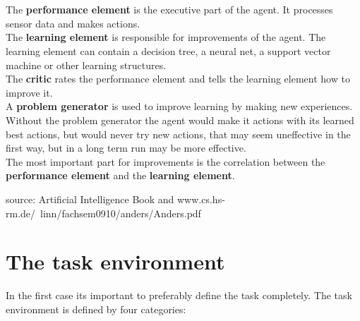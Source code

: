 \documentclass[10pt,a4paper,DIV=11]{scrreprt}
\begin{document}
   \\
\\

The \textbf{performance element} is the executive part of the agent. It processes sensor data and makes actions. \\

The \textbf{learning element} is responsible for improvements of the agent. The learning element can contain a decision tree, a neural net, a support vector machine or other learning structures. \\

The \textbf{critic} rates the performance element and tells the learning element how to improve it. \\

A \textbf{problem generator} is used to improve learning by making new experiences. Without the problem generator the agent would make it actions with its learned best actions, but would never try new actions, that may seem uneffective in the first way, but in a long term run may be more effective. \\

The most important part for improvements is the correlation between the \textbf{performance element} and the \textbf{learning element}.





source: Artificial Intelligence Book and www.cs.hs-rm.de/~linn/fachsem0910/anders/Anders.pdf


\section{The task environment}
\label{sec:env}
In the first case its important to preferably define the task completely. The task environment is defined by four categories: \\
\end{document}
